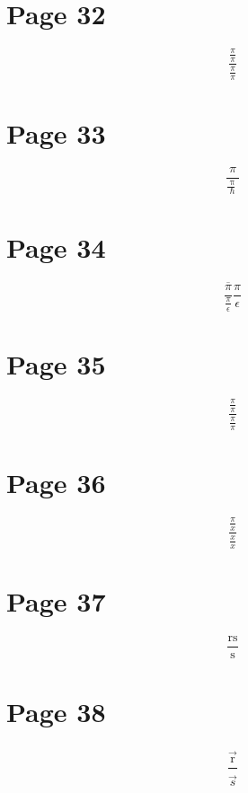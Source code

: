 \documentclass{article}
\begin{document}
\section{Page 32}
\begin{equation}
\frac{\frac{\pi}{\pi}}{\frac{\pi}{\pi}}
\end{equation}

\section{Page 33}
\begin{equation}
\frac{\pi}{\mathrm{\frac{~\pi}{~\hbar}~}}
\end{equation}

\section{Page 34}
\begin{equation}
\frac{\overline{{\pi}}}{\frac{\pi}{\epsilon}}{\frac{\pi}{\epsilon}}
\end{equation}

\section{Page 35}
\begin{equation}
\frac{\frac{\pi}{\pi}}{\frac{\pi}{\pi}}
\end{equation}

\section{Page 36}
\begin{equation}
\frac{\frac{\pi}{x}}{\frac{x}{x}}
\end{equation}

\section{Page 37}
\begin{equation}
\frac{\mathrm{rs}}{\mathrm{s}}
\end{equation}

\section{Page 38}
\begin{equation}
\frac{\hat{\vec{\mathrm{r}}}}{\hat{\vec{s}}}
\end{equation}
\end{document}
